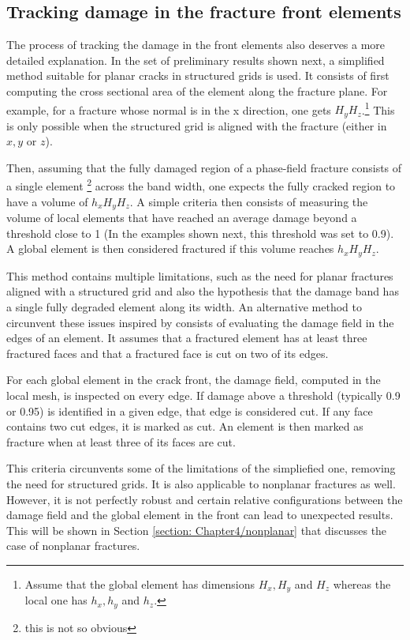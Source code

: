 \subsection{Tracking damage in the fracture front elements}

The process of tracking the damage in the front elements also deserves a more detailed explanation. In the set of preliminary results shown next, a simplified method suitable for planar cracks in structured grids is used. It consists of first computing the cross sectional area of the element along the fracture plane. For example, for a fracture whose normal is in the x direction, one gets $H_yH_z$.\footnote{Assume that the global element has dimensions $H_x, H_y$ and $H_z$ whereas the local one has $h_x, h_y$ and $h_z$.} This is only possible when the structured grid is aligned with the fracture (either in $x, y$ or $z$).

Then, assuming that the fully damaged region of a phase-field fracture consists of a single element \footnote{this is not so obvious} across the band width, one expects the fully cracked region to have a volume of $h_xH_yH_z$. A simple criteria then consists of measuring the volume of local elements that have reached an average damage beyond a threshold close to 1 (In the examples shown next, this threshold was set to 0.9). A global element is then considered fractured if this volume reaches $h_xH_yH_z$.

This method contains multiple limitations, such as the need for planar fractures aligned with a structured grid and also the hypothesis that the damage band has a single fully degraded element along its width. An alternative method to circunvent these issues inspired by \cite{muixi2021combined} consists of evaluating the damage field in the edges of an element. It assumes that a fractured element has at least three fractured faces and that a fractured face is cut on two of its edges.

For each global element in the crack front, the damage field, computed in the local mesh, is inspected on every edge. If damage above a threshold (typically 0.9 or 0.95) is identified in a given edge, that edge is considered cut. If any face contains two cut edges, it is marked as cut. An element is then marked as fracture when at least three of its faces are cut.

This criteria circunvents some of the limitations of the simpliefied one, removing the need for structured grids. It is also applicable to nonplanar fractures as well. However, it is not perfectly robust and certain relative configurations between the damage field and the global element in the front can lead to unexpected results. This will be shown in Section \ref{section: Chapter4/nonplanar} that discusses the case of nonplanar fractures.


